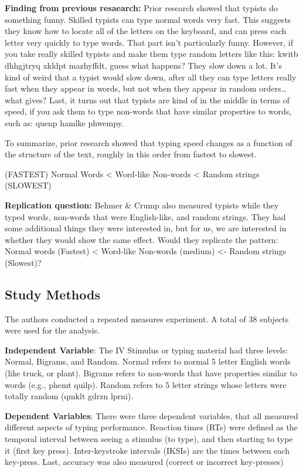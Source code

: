 \documentclass[]{book}
\begin{document}
\textbf{Finding from previous resaearch:} Prior research showed that
typists do something funny. Skilled typists can type normal words very
fast. This suggests they know how to locate all of the letters on the
keyboard, and can press each letter very quickly to type words. That
part isn't particularly funny. However, if you take really skilled
typists and make them type random letters like this: kwitb dhhgjtryq
xkldpt mazhyffdt, guess what happens? They slow down a lot. It's kind of
weird that a typist would slow down, after all they can type letters
really fast when they appear in words, but not when they appear in
random orders\ldots{}what gives? Last, it turns out that typists are
kind of in the middle in terms of speed, if you ask them to type
non-words that have similar properties to words, such as: quenp hamlke
phwempy.

To summarize, prior research showed that typing speed changes as a
function of the structure of the text, roughly in this order from
fastest to slowest.

(FASTEST) Normal Words \textless{} Word-like Non-words \textless{}
Random strings (SLOWEST)

\textbf{Replication question:} Behmer \& Crump also measured typists
while they typed words, non-words that were English-like, and random
strings. They had some additional things they were interested in, but
for us, we are interested in whether they would show the same effect.
Would they replicate the pattern: Normal words (Fastest) \textless{}
Word-like Non-words (medium) \textless{}- Random strings (Slowest)?

\subsection{Study Methods}\label{study-methods-1}

The authors conducted a repeated measures experiment. A total of 38
subjects were used for the analysis.

\textbf{Independent Variable}: The IV Stimulus or typing material had
three levels: Normal, Bigrams, and Random. Normal refers to normal 5
letter English words (like truck, or plant). Bigrams refers to non-words
that have properties similar to words (e.g., phemt quilp). Random refers
to 5 letter strings whose letters were totally random (qmklt gdrzn
lprni).

\textbf{Dependent Variables}: There were three dependent variables, that
all measured different aspects of typing performance. Reaction times
(RTs) were defined as the temporal interval between seeing a stimulus
(to type), and then starting to type it (first key press).
Inter-keystroke intervals (IKSIs) are the times between each key-press.
Last, accuracy was also measured (correct or incorrect key-presses)
\end{document}
